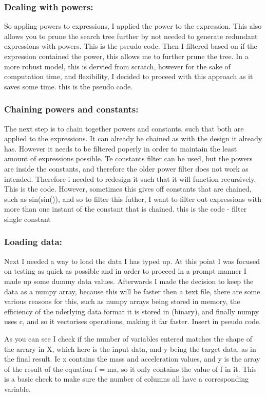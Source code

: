 \documentclass{article}
\begin{document}
\subsubsection{Dealing with powers:}
So appling powers to expressions, I applied the power to the expression. This also allows you to prune the
search tree further by not needed to generate redundant expressions with powers.
This is the pseudo code.
Then I filtered based on if the expression contained the power, this allows me to further prune the tree. In a more
robust model, this is dervied from scratch, however for the sake of computation time, and flexibility, I decided
to proceed with this approach as it saves some time.
this is the pseudo code.
\subsubsection{Chaining powers and constants:}
The next step is to chain together powers and constants, such that both are applied to the expressions. It can
already be chained as with the design it already has. However it needs to be filtered poperly in order to maintain
the least amount of expressions possible.
Te constants filter can be used, but the powers are inside the constants, and therefore the older power filter does
not work as intended. Therefore i needed to redesign it such that it will function recursively.
This is the code.
However, sometimes this gives off constants that are chained, such as sin(sin()), and so to filter this futher, I
want to filter out expressions with more than one instant of the constant that is chained.
this is the code - filter single constant
\subsubsection{Loading data:}

Next I needed a way to load the data I has typed up. At this point I was focused on testing as quick as possible
and in order to proceed in a prompt manner I made up some dummy data values. Afterwards I made the decision
to keep the data as a numpy array, because this will be faster then a text file, there are some various reasons for
this, such as numpy arrays being stored in memory, the efficiency of the nderlying data format it is stored in
(binary), and finally numpy uses c, and so it vectorises operations, making it far faster.
Insert in pseudo code.


As you can see I check if the number of variables entered matches the shape of the arrary in X, which here is the
input data, and y being the target data, as in the final result. Ie x contains the mass and acceleration values, and
y is the array of the result of the equation f = ma, so it only contains the value of f in it. This is a basic check to
make sure the number of columns all have a corresponding variable.
\end{document}
